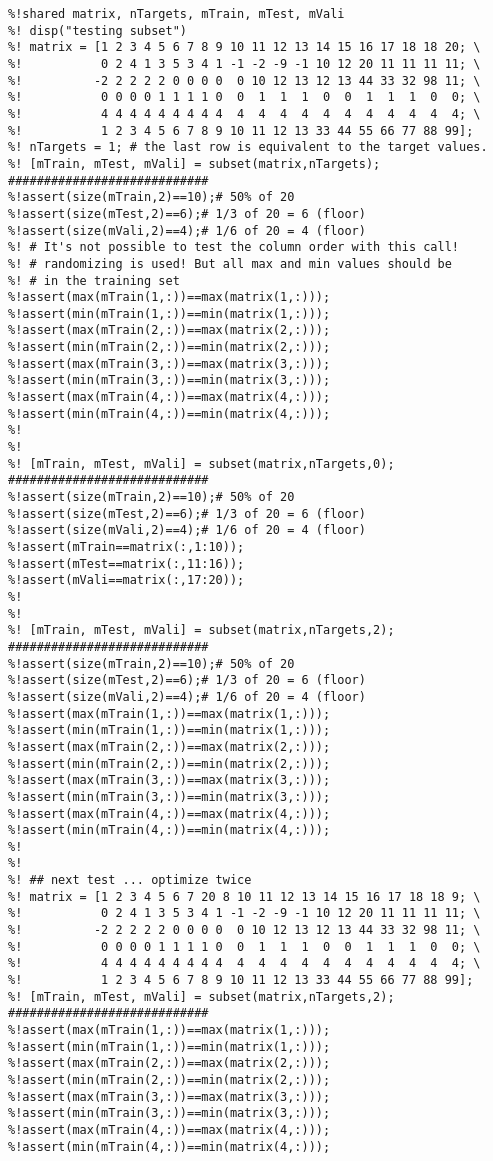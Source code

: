 \begin{verbatim}
%!shared matrix, nTargets, mTrain, mTest, mVali
%! disp("testing subset")
%! matrix = [1 2 3 4 5 6 7 8 9 10 11 12 13 14 15 16 17 18 18 20; \
%!			 0 2 4 1 3 5 3 4 1 -1 -2 -9 -1 10 12 20 11 11 11 11; \
%!			-2 2 2 2 2 0 0 0 0  0 10 12 13 12 13 44 33 32 98 11; \
%!			 0 0 0 0 1 1 1 1 0  0  1  1  1  0  0  1  1  1  0  0; \
%!           4 4 4 4 4 4 4 4 4  4  4  4  4  4  4  4  4  4  4  4; \
%!           1 2 3 4 5 6 7 8 9 10 11 12 13 33 44 55 66 77 88 99];
%! nTargets = 1; # the last row is equivalent to the target values.
%! [mTrain, mTest, mVali] = subset(matrix,nTargets);  ############################
%!assert(size(mTrain,2)==10);# 50% of 20
%!assert(size(mTest,2)==6);# 1/3 of 20 = 6 (floor)
%!assert(size(mVali,2)==4);# 1/6 of 20 = 4 (floor)
%! # It's not possible to test the column order with this call!
%! # randomizing is used! But all max and min values should be
%! # in the training set
%!assert(max(mTrain(1,:))==max(matrix(1,:)));
%!assert(min(mTrain(1,:))==min(matrix(1,:)));
%!assert(max(mTrain(2,:))==max(matrix(2,:)));
%!assert(min(mTrain(2,:))==min(matrix(2,:)));
%!assert(max(mTrain(3,:))==max(matrix(3,:)));
%!assert(min(mTrain(3,:))==min(matrix(3,:)));
%!assert(max(mTrain(4,:))==max(matrix(4,:)));
%!assert(min(mTrain(4,:))==min(matrix(4,:)));
%!
%!
%! [mTrain, mTest, mVali] = subset(matrix,nTargets,0);  ############################
%!assert(size(mTrain,2)==10);# 50% of 20
%!assert(size(mTest,2)==6);# 1/3 of 20 = 6 (floor)
%!assert(size(mVali,2)==4);# 1/6 of 20 = 4 (floor)
%!assert(mTrain==matrix(:,1:10));
%!assert(mTest==matrix(:,11:16));
%!assert(mVali==matrix(:,17:20));
%!
%!
%! [mTrain, mTest, mVali] = subset(matrix,nTargets,2);  ############################
%!assert(size(mTrain,2)==10);# 50% of 20
%!assert(size(mTest,2)==6);# 1/3 of 20 = 6 (floor)
%!assert(size(mVali,2)==4);# 1/6 of 20 = 4 (floor)
%!assert(max(mTrain(1,:))==max(matrix(1,:)));
%!assert(min(mTrain(1,:))==min(matrix(1,:)));
%!assert(max(mTrain(2,:))==max(matrix(2,:)));
%!assert(min(mTrain(2,:))==min(matrix(2,:)));
%!assert(max(mTrain(3,:))==max(matrix(3,:)));
%!assert(min(mTrain(3,:))==min(matrix(3,:)));
%!assert(max(mTrain(4,:))==max(matrix(4,:)));
%!assert(min(mTrain(4,:))==min(matrix(4,:)));
%!
%!
%! ## next test ... optimize twice
%! matrix = [1 2 3 4 5 6 7 20 8 10 11 12 13 14 15 16 17 18 18 9; \
%!			 0 2 4 1 3 5 3 4 1 -1 -2 -9 -1 10 12 20 11 11 11 11; \
%!			-2 2 2 2 2 0 0 0 0  0 10 12 13 12 13 44 33 32 98 11; \
%!			 0 0 0 0 1 1 1 1 0  0  1  1  1  0  0  1  1  1  0  0; \
%!           4 4 4 4 4 4 4 4 4  4  4  4  4  4  4  4  4  4  4  4; \
%!           1 2 3 4 5 6 7 8 9 10 11 12 13 33 44 55 66 77 88 99];
%! [mTrain, mTest, mVali] = subset(matrix,nTargets,2);  ############################
%!assert(max(mTrain(1,:))==max(matrix(1,:)));
%!assert(min(mTrain(1,:))==min(matrix(1,:)));
%!assert(max(mTrain(2,:))==max(matrix(2,:)));
%!assert(min(mTrain(2,:))==min(matrix(2,:)));
%!assert(max(mTrain(3,:))==max(matrix(3,:)));
%!assert(min(mTrain(3,:))==min(matrix(3,:)));
%!assert(max(mTrain(4,:))==max(matrix(4,:)));
%!assert(min(mTrain(4,:))==min(matrix(4,:)));
\end{verbatim}
